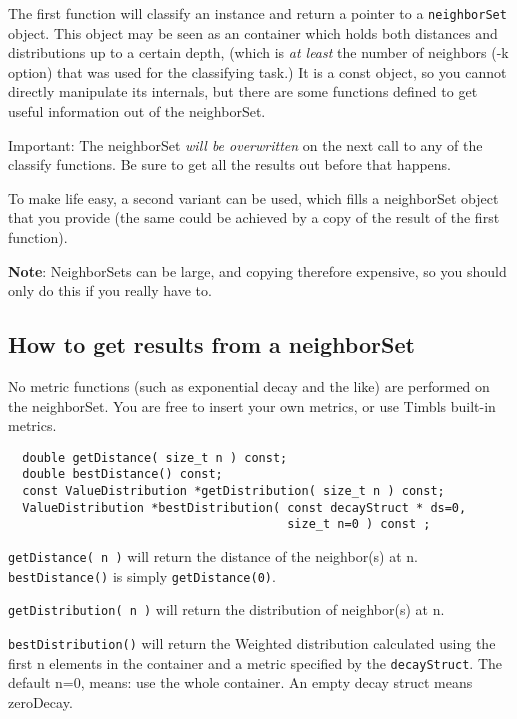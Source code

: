 \documentclass{report}
\begin{document}
The first function will classify an instance and return a pointer to a
{\tt neighborSet} object. This object may be seen as an container
which holds both distances and distributions up to a certain depth,
(which is {\em at least}\/ the number of neighbors (-k option) that
was used for the classifying task.)  It is a const object, so you
cannot directly manipulate its internals, but there are some
functions defined to get useful information out of the neighborSet.

Important:  The neighborSet {\em will be overwritten}\/ on the next
call to any of the classify functions. Be sure to get all the
results out before that happens.

To make life easy, a second variant can be used, which fills a
neighborSet object that you provide (the same could be achieved by a
copy of the result of the first function). 

{\bf Note}: NeighborSets can be large, and copying therefore
expensive, so you should only do this if you really have to.

\subsection{How to get results from a neighborSet}

No metric functions (such as exponential decay and the like) are
performed on the neighborSet. You are free to insert your own metrics, or
use Timbls built-in metrics.

\begin{footnotesize}
\begin{verbatim}
  double getDistance( size_t n ) const;
  double bestDistance() const;
  const ValueDistribution *getDistribution( size_t n ) const;
  ValueDistribution *bestDistribution( const decayStruct * ds=0,
                                       size_t n=0 ) const ;
\end{verbatim}
\end{footnotesize}

{\tt getDistance( n )} will return the distance of the neighbor(s) at n.
{\tt bestDistance()} is simply {\tt getDistance(0)}.

{\tt getDistribution( n )} will return the distribution of neighbor(s) at
n.

{\tt bestDistribution()} will return the Weighted distribution
calculated using the first n elements in the container and a metric
specified by the {\tt decayStruct}.  The default n=0, means: use the
whole container. An empty decay struct means zeroDecay.
\end{document}
